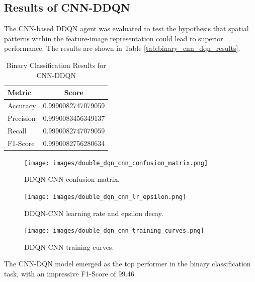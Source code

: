 \documentclass[12pt]{report}
\begin{document}
\subsection{Results of CNN-DDQN}
The CNN-based DDQN agent was evaluated to test the hypothesis that spatial patterns within the feature-image representation could lead to superior performance. The results are shown in Table \ref{tab:binary_cnn_dqn_results}.

\begin{table}[H]
    \centering
    \caption{Binary Classification Results for CNN-DDQN}
    \label{tab:binary_cnn_ddqn_results}
    \begin{tabular}{@{}lc@{}}
        \toprule
        \textbf{Metric} & \textbf{Score} \\
        \midrule
        Accuracy & 0.9990082747079059 \\
        Precision & 0.9990083456349137 \\
        Recall & 0.9990082747079059 \\
        F1-Score & 0.9990082756280634 \\
        \bottomrule
    \end{tabular}
\end{table}

\begin{figure}[htbp]
    \centering
    \texttt{[image: images/double\_dqn\_cnn\_confusion\_matrix.png]}
    \caption{DDQN-CNN confusion matrix.}
    \label{fig:ddqn_cnn_confusion}
\end{figure}

\vspace{0.5cm}

\begin{figure}[htbp]
    \centering
    \texttt{[image: images/double\_dqn\_cnn\_lr\_epsilon.png]}
    \caption{DDQN-CNN learning rate and epsilon decay.}
    \label{fig:ddqn_cnn_lr_epsilon_cnn}
\end{figure}

\vspace{0.5cm}

\begin{figure}[htbp]
    \centering
    \texttt{[image: images/double\_dqn\_cnn\_training\_curves.png]}
    \caption{DDQN-CNN training curves.}
    \label{fig:ddqn_cnn_training_curves}
\end{figure}

The CNN-DQN model emerged as the top performer in the binary classification task, with an impressive F1-Score of 99.46
\end{document}
